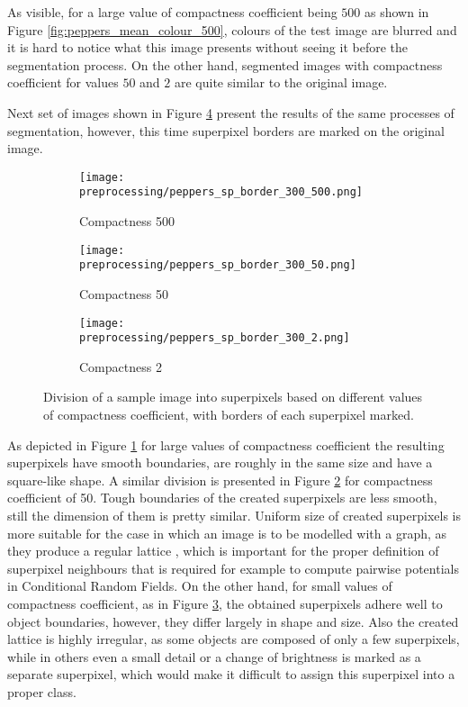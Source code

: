 As visible, for a large value of compactness coefficient being $500$ as shown in Figure \ref{fig:peppers_mean_colour_500}, colours of the test image are blurred and it is hard to notice what this image presents without seeing it before the segmentation process. On the other hand, segmented images with compactness coefficient for values $50$ and $2$ are quite similar to the original image.

Next set of images shown in Figure \ref{fig:peppers_boundaries} present the results of the same processes of segmentation, however, this time superpixel borders are marked on the original image.
\begin{figure}[ht]
 \centering
  \begin{subfigure}[h]{0.32\textwidth}
    \texttt{[image: preprocessing/peppers\_sp\_border\_300\_500.png]}
    \caption{Compactness 500}
    \label{fig:peppers_boundaries_500}
  \end{subfigure}
  \begin{subfigure}[h]{0.32\textwidth}
    \texttt{[image: preprocessing/peppers\_sp\_border\_300\_50.png]}
    \caption{Compactness 50}
    \label{fig:peppers_boundaries_50}
  \end{subfigure}
    \begin{subfigure}[h]{0.32\textwidth}
    \texttt{[image: preprocessing/peppers\_sp\_border\_300\_2.png]}
    \caption{Compactness 2}
    \label{fig:peppers_boundaries_2}
  \end{subfigure}
     \caption{Division of a sample image into superpixels based on different values of compactness coefficient, with borders of each superpixel marked.}%
    \label{fig:peppers_boundaries}       
\end{figure}
As depicted in Figure \ref{fig:peppers_boundaries_500} for large values of compactness coefficient the resulting superpixels have smooth boundaries, are roughly in the same size and have a square-like shape. A similar division is presented in Figure \ref{fig:peppers_boundaries_50} for compactness coefficient of 50. Tough boundaries of the created superpixels are less smooth, still the dimension of them is pretty similar. Uniform size of created superpixels is more suitable for the case in which an image is to be modelled with a graph, as they produce a regular lattice \cite{superpixels_compactness}, which is important for the proper definition of superpixel neighbours that is required for example to compute pairwise potentials in Conditional Random Fields. On the other hand, for small values of compactness coefficient, as in Figure \ref{fig:peppers_boundaries_2}, the obtained superpixels adhere well to object boundaries, however, they differ largely in shape and size. Also the created lattice is highly irregular, as some objects are composed of only a few superpixels, while in others even a small detail or a change of brightness is marked as a separate superpixel, which would make it difficult to assign this superpixel into a proper class.
